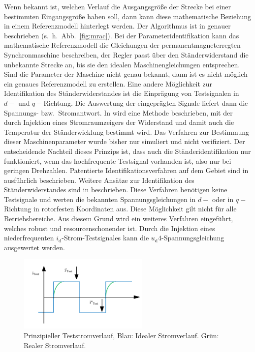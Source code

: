 \documentclass[conference,twocolumn]{IEEEtran}
\newcommand{\x}[1]{\mathrm{#1}}
\begin{document}
Wenn bekannt ist, welchen Verlauf die Ausgangsgröße der Strecke bei einer bestimmten Eingangsgröße haben soll, dann kann diese mathematische Beziehung in einem Referenzmodell hinterlegt werden.
Der Algorithmus ist in \autocite{slotine_applied_1991} genauer beschrieben (s.~h.~Abb.~\ref{fig:mrac}).
Bei der Parameteridentifikation kann das mathematische Referenzmodell die Gleichungen der permanentmagneterregten Synchronmaschine beschreiben, der Regler passt über den Ständerwiderstand die unbekannte Strecke an, bis sie den idealen Maschinengleichungen entsprechen.
Sind die Parameter der Maschine nicht genau bekannt, dann ist es nicht möglich ein genaues Referenzmodell zu erstellen.
Eine andere Möglichkeit zur Identifikation des Ständerwiderstandes ist die Einprägung von Testsignalen in $d-$ und $q-$Richtung.
Die Auswertung der eingeprägten Signale liefert dann die Spannungs- bzw.\ Stromantwort.
In \autocite{wilson2005} wird eine Methode beschrieben, mit der durch Injektion eines Stromraumzeigers der Widerstand und damit auch die Temperatur der Ständerwicklung bestimmt wird.
Das Verfahren zur Bestimmung dieser Maschinenparameter wurde bisher nur simuliert und nicht verifiziert.
Der entscheidende Nachteil dieses Prinzips ist, dass auch die Ständeridentifikation nur funktioniert, wenn das hochfrequente Testsignal vorhanden ist, also nur bei geringen Drehzahlen.
Patentierte Identifikationsverfahren auf dem Gebiet sind in \autocites{schutzrecht1}{schutzrecht2} ausführlich beschrieben.
Weitere Ansätze zur Identifikation des Ständerwiderstandes sind in \textcite{Kellner2012} beschrieben.
Diese Verfahren benötigen keine Testsignale und werten die bekannten Spannungsgleichungen in $d-$ oder in $q-$Richtung in rotorfesten Koordinaten aus.
Diese Möglichkeit gilt nicht für alle Betriebsbereiche. 
Aus diesem Grund wird ein weiteres Verfahren eingeführt, welches robust und resourcenschonender ist.
Durch die Injektion eines niederfrequenten $i_\x{d}$-Strom-Testsignales kann die $u_\x{d}4$-Spannungsgleichung ausgewertet werden.

\begin{figure}[!h]
\centering
\includegraphics[width=2.5in]{img/test-strom}
\caption{Prinzipieller Teststromverlauf, Blau: Idealer Stromverlauf. Grün: Realer Stromverlauf.}
\label{fig:test-strom}
\end{figure}
\end{document}
